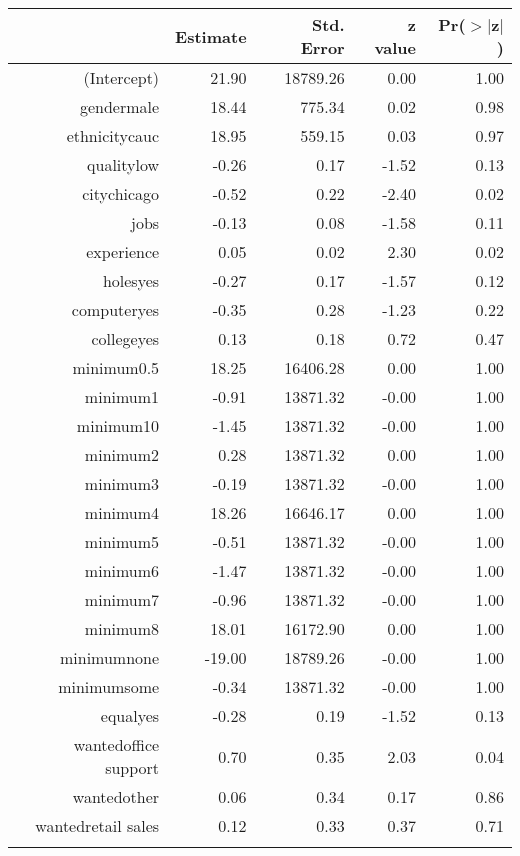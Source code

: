 \begin{table}[ht]
\centering
\begin{tabular}{rrrrr}
  \hline
 & Estimate & Std. Error & z value & Pr($>$$|$z$|$) \\ 
  \hline
(Intercept) & 21.90 & 18789.26 & 0.00 & 1.00 \\ 
  gendermale & 18.44 & 775.34 & 0.02 & 0.98 \\ 
  ethnicitycauc & 18.95 & 559.15 & 0.03 & 0.97 \\ 
  qualitylow & -0.26 & 0.17 & -1.52 & 0.13 \\ 
  citychicago & -0.52 & 0.22 & -2.40 & 0.02 \\ 
  jobs & -0.13 & 0.08 & -1.58 & 0.11 \\ 
  experience & 0.05 & 0.02 & 2.30 & 0.02 \\ 
  holesyes & -0.27 & 0.17 & -1.57 & 0.12 \\ 
  computeryes & -0.35 & 0.28 & -1.23 & 0.22 \\ 
  collegeyes & 0.13 & 0.18 & 0.72 & 0.47 \\ 
  minimum0.5 & 18.25 & 16406.28 & 0.00 & 1.00 \\ 
  minimum1 & -0.91 & 13871.32 & -0.00 & 1.00 \\ 
  minimum10 & -1.45 & 13871.32 & -0.00 & 1.00 \\ 
  minimum2 & 0.28 & 13871.32 & 0.00 & 1.00 \\ 
  minimum3 & -0.19 & 13871.32 & -0.00 & 1.00 \\ 
  minimum4 & 18.26 & 16646.17 & 0.00 & 1.00 \\ 
  minimum5 & -0.51 & 13871.32 & -0.00 & 1.00 \\ 
  minimum6 & -1.47 & 13871.32 & -0.00 & 1.00 \\ 
  minimum7 & -0.96 & 13871.32 & -0.00 & 1.00 \\ 
  minimum8 & 18.01 & 16172.90 & 0.00 & 1.00 \\ 
  minimumnone & -19.00 & 18789.26 & -0.00 & 1.00 \\ 
  minimumsome & -0.34 & 13871.32 & -0.00 & 1.00 \\ 
  equalyes & -0.28 & 0.19 & -1.52 & 0.13 \\ 
  wantedoffice support & 0.70 & 0.35 & 2.03 & 0.04 \\ 
  wantedother & 0.06 & 0.34 & 0.17 & 0.86 \\ 
  wantedretail sales & 0.12 & 0.33 & 0.37 & 0.71 \\ 
$$
\end{tabular}
\end{table}
